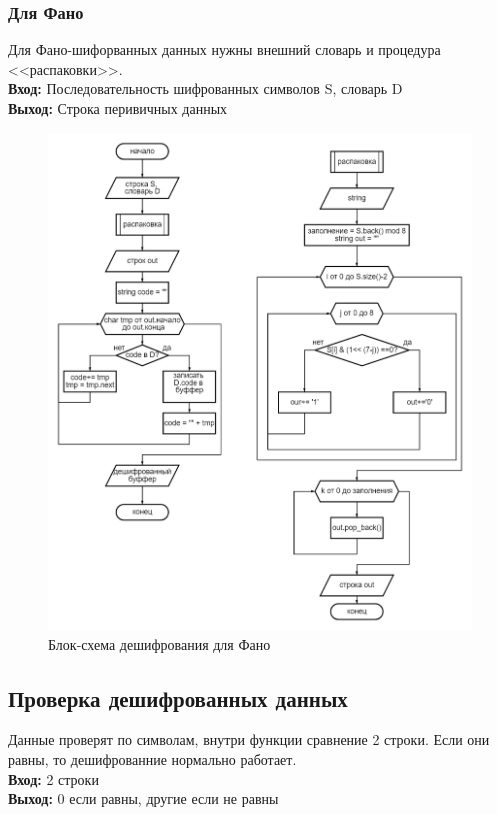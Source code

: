 \documentclass[12pt]{article} %
\begin{document}
\subsubsection{Для Фано}
Для Фано-шифорванных данных нужны внешний словарь и процедура <<распаковки>>. \\
\textbf{Вход: }Последовательность шифрованных символов S, словарь D\\
\textbf{Выход: } Строка перивичных данных \\
 \begin{figure}[H]
\centering \includegraphics[scale =0.33]{decodefano.png}
\caption{Блок-схема дешифрования для Фано}
\end{figure}
\subsection{Проверка дешифрованных данных}
Данные проверят по символам,  внутри функции сравнение 2 строки. Если они равны, то дешифрованние нормально работает. \\
\textbf{Вход: }2 строки\\
\textbf{Выход: } 0 если равны, другие если не равны \\
\end{document}

